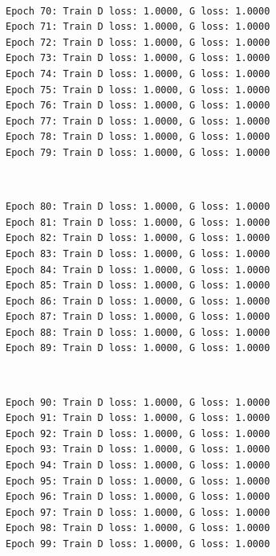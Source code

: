 \documentclass[11pt]{article}
\begin{document}
    \begin{center}
    \end{center}
    { \hspace*{\fill} \\}
    
    \begin{Verbatim}[commandchars=\\\{\}]
Epoch 70: Train D loss: 1.0000, G loss: 1.0000
Epoch 71: Train D loss: 1.0000, G loss: 1.0000
Epoch 72: Train D loss: 1.0000, G loss: 1.0000
Epoch 73: Train D loss: 1.0000, G loss: 1.0000
Epoch 74: Train D loss: 1.0000, G loss: 1.0000
Epoch 75: Train D loss: 1.0000, G loss: 1.0000
Epoch 76: Train D loss: 1.0000, G loss: 1.0000
Epoch 77: Train D loss: 1.0000, G loss: 1.0000
Epoch 78: Train D loss: 1.0000, G loss: 1.0000
Epoch 79: Train D loss: 1.0000, G loss: 1.0000

    \end{Verbatim}

    \begin{center}
    \end{center}
    { \hspace*{\fill} \\}
    
    \begin{Verbatim}[commandchars=\\\{\}]
Epoch 80: Train D loss: 1.0000, G loss: 1.0000
Epoch 81: Train D loss: 1.0000, G loss: 1.0000
Epoch 82: Train D loss: 1.0000, G loss: 1.0000
Epoch 83: Train D loss: 1.0000, G loss: 1.0000
Epoch 84: Train D loss: 1.0000, G loss: 1.0000
Epoch 85: Train D loss: 1.0000, G loss: 1.0000
Epoch 86: Train D loss: 1.0000, G loss: 1.0000
Epoch 87: Train D loss: 1.0000, G loss: 1.0000
Epoch 88: Train D loss: 1.0000, G loss: 1.0000
Epoch 89: Train D loss: 1.0000, G loss: 1.0000

    \end{Verbatim}

    \begin{center}
    \end{center}
    { \hspace*{\fill} \\}
    
    \begin{Verbatim}[commandchars=\\\{\}]
Epoch 90: Train D loss: 1.0000, G loss: 1.0000
Epoch 91: Train D loss: 1.0000, G loss: 1.0000
Epoch 92: Train D loss: 1.0000, G loss: 1.0000
Epoch 93: Train D loss: 1.0000, G loss: 1.0000
Epoch 94: Train D loss: 1.0000, G loss: 1.0000
Epoch 95: Train D loss: 1.0000, G loss: 1.0000
Epoch 96: Train D loss: 1.0000, G loss: 1.0000
Epoch 97: Train D loss: 1.0000, G loss: 1.0000
Epoch 98: Train D loss: 1.0000, G loss: 1.0000
Epoch 99: Train D loss: 1.0000, G loss: 1.0000

    \end{Verbatim}
\end{document}
